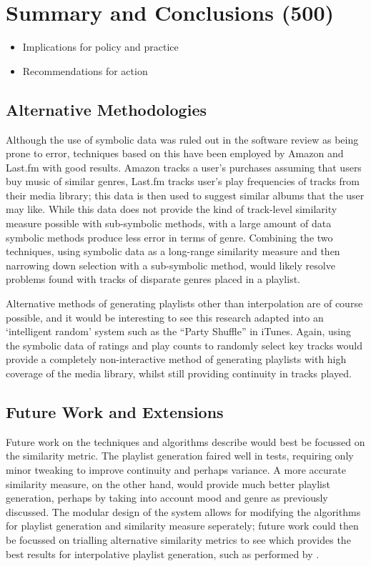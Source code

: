 \chapter{Summary and Conclusions (500)}
\begin{itemize}
	\item Implications for policy and practice
	\item Recommendations for action
\end{itemize}
\section{Alternative Methodologies}
Although the use of symbolic data was ruled out in the software review as being prone to error, techniques based on this have been employed by Amazon and Last.fm with good results. Amazon tracks a user's purchases assuming that users buy music of similar genres, Last.fm tracks user's play frequencies of tracks from their media library; this data is then used to suggest similar albums that the user may like. While this data does not provide the kind of track-level similarity measure possible with sub-symbolic methods, with a large amount of data symbolic methods produce less error in terms of genre. Combining the two techniques, using symbolic data as a long-range similarity measure and then narrowing down selection with a sub-symbolic method, would likely resolve problems found with tracks of disparate genres placed in a playlist.

Alternative methods of generating playlists other than interpolation are of course possible, and it would be interesting to see this research adapted into an `intelligent random' system such as the ``Party Shuffle'' in iTunes. Again, using the symbolic data of ratings and play counts to randomly select key tracks would provide a completely non-interactive method of generating playlists with high coverage of the media library, whilst still providing continuity in tracks played.
\section{Future Work and Extensions}
Future work on the techniques and algorithms describe would best be focussed on the similarity metric. The playlist generation faired well in tests, requiring only minor tweaking to improve continuity and perhaps variance. A more accurate similarity measure, on the other hand, would provide much better playlist generation, perhaps by taking into account mood and genre as previously discussed. The modular design of the system allows for modifying the algorithms for playlist generation and similarity measure seperately; future work could then be focussed on trialling alternative similarity metrics to see which provides the best results for interpolative playlist generation, such as performed by \citet*{Berenzweig2003}. 

